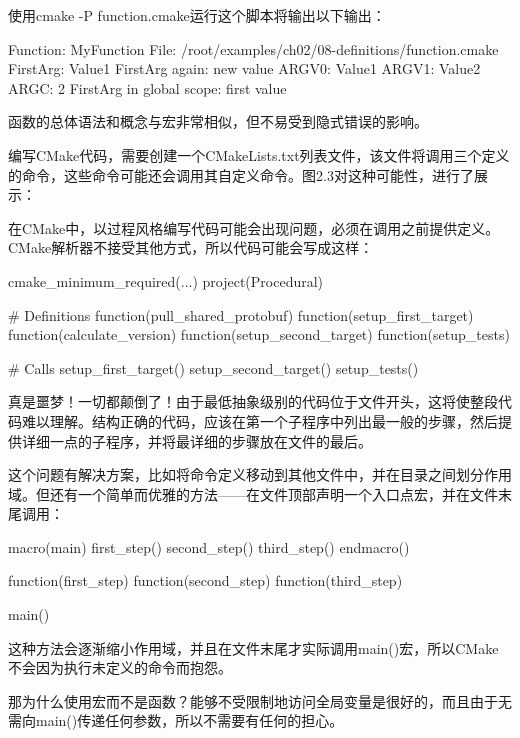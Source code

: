 使用cmake -P function.cmake运行这个脚本将输出以下输出：

\begin{shell}
Function: MyFunction
File: /root/examples/ch02/08-definitions/function.cmake
FirstArg: Value1
FirstArg again: new value
ARGV0: Value1 ARGV1: Value2 ARGC: 2
FirstArg in global scope: first value
\end{shell}

函数的总体语法和概念与宏非常相似，但不易受到隐式错误的影响。


编写CMake代码，需要创建一个CMakeLists.txt列表文件，该文件将调用三个定义的命令，这些命令可能还会调用其自定义命令。图2.3对这种可能性，进行了展示：


在CMake中，以过程风格编写代码可能会出现问题，必须在调用之前提供定义。CMake解析器不接受其他方式，所以代码可能会写成这样：

\begin{cmake}
cmake_minimum_required(...)
project(Procedural)

# Definitions
function(pull_shared_protobuf)
function(setup_first_target)
function(calculate_version)
function(setup_second_target)
function(setup_tests)

# Calls
setup_first_target()
setup_second_target()
setup_tests()
\end{cmake}

真是噩梦！一切都颠倒了！由于最低抽象级别的代码位于文件开头，这将使整段代码难以理解。结构正确的代码，应该在第一个子程序中列出最一般的步骤，然后提供详细一点的子程序，并将最详细的步骤放在文件的最后。

这个问题有解决方案，比如将命令定义移动到其他文件中，并在目录之间划分作用域。但还有一个简单而优雅的方法——在文件顶部声明一个入口点宏，并在文件末尾调用：

\begin{cmake}
macro(main)
    first_step()
    second_step()
    third_step()
endmacro()

function(first_step)
function(second_step)
function(third_step)

main()
\end{cmake}

这种方法会逐渐缩小作用域，并且在文件末尾才实际调用main()宏，所以CMake不会因为执行未定义的命令而抱怨。

那为什么使用宏而不是函数？能够不受限制地访问全局变量是很好的，而且由于无需向main()传递任何参数，所以不需要有任何的担心。

